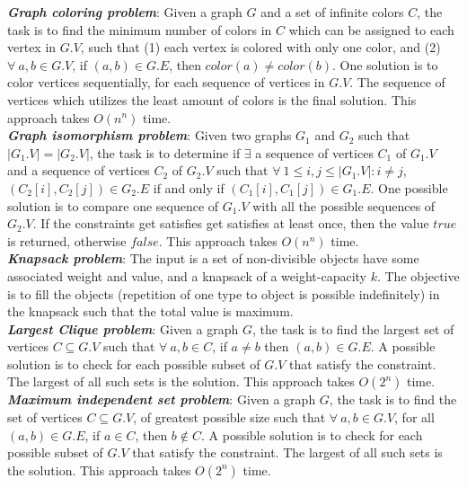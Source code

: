 \textbf{\textit{Graph coloring problem}}: Given a graph $G$ and a set of infinite colors $C$, the task is to find the minimum number of colors in $C$ which can be assigned to each vertex in $G.V$, such that (1) each vertex is colored with only one color, and (2) $\forall\ a,b \in G.V$, if $(a,b) \in G.E$, then $color(a) \neq color(b)$. One solution is to color vertices sequentially, for each sequence of vertices in $G.V$. The sequence of vertices which utilizes the least amount of colors is the final solution. This approach takes $O(n^n)$ time.\\

\textbf{\textit{Graph isomorphism problem}}: Given two graphs $G_1$ and $G_2$ such that $|G_1.V| = |G_2.V|$, the task is to determine if $\exists$ a sequence of vertices $C_1$ of $G_1.V$ and a sequence of vertices $C_2$ of $G_2.V$ such that $\forall\ 1\leq i,j\leq |G_1.V|: i\neq j$, $(C_2[i],C_2[j]) \in G_2.E$ if and only if $(C_1[i],C_1[j]) \in G_1.E$. One possible solution is to compare one sequence of $G_1.V$ with all the possible sequences of $G_2.V$. If the constraints get satisfies get satisfies at least once, then the value $true$ is returned, otherwise $false$. This approach takes $O(n^n)$ time.\\

\textbf{\textit{Knapsack problem}}: The input is a set of non-divisible objects have some associated weight and value, and a knapsack of a weight-capacity $k$. The objective is to fill the objects (repetition of one type to object is possible indefinitely) in the knapsack such that the total value is maximum.\\

\textbf{\textit{Largest Clique problem}}: Given a graph $G$, the task is to find the largest set of vertices $C\subseteq G.V$ such that $\forall\ a,b \in C$, if $a\neq b$ then $(a,b) \in G.E$. A possible solution is to check for each possible subset of $G.V$ that satisfy the constraint. The largest of all such sets is the solution. This approach takes $O(2^n)$ time.\\

\textbf{\textit{Maximum independent set problem}}: Given a graph $G$, the task is to find the set of vertices $C\subseteq G.V$, of greatest possible size such that $\forall\ a,b \in G.V$, for all $(a,b) \in G.E$, if $a \in C$, then $b \not\in C$. A possible solution is to check for each possible subset of $G.V$ that satisfy the constraint. The largest of all such sets is the solution. This approach takes $O(2^n)$ time.\\


